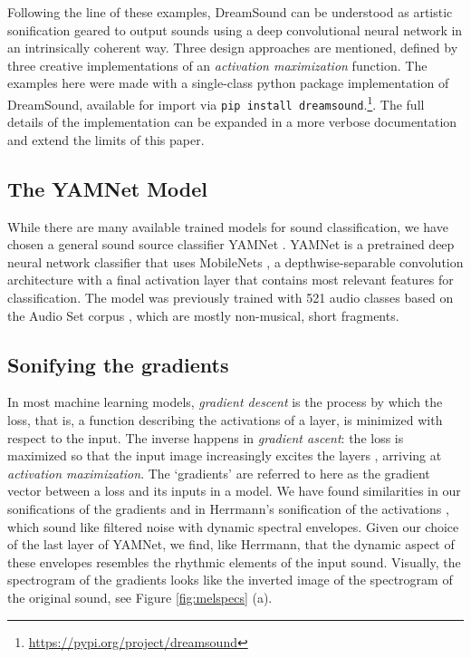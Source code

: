 \documentclass[a4paper,10pt,oneside]{article}
\begin{document}
\begin{sloppy}
Following the line of these examples, DreamSound can be understood as artistic sonification geared to output sounds using a deep convolutional neural network in an intrinsically coherent way. Three design approaches are mentioned, defined by three creative implementations of an \textit{activation maximization} function. The examples here were made with a single-class python package implementation of DreamSound, available for import via \texttt{pip install dreamsound}.\footnote{\url{https://pypi.org/project/dreamsound}}. The full details of the implementation can be expanded in a more verbose documentation and extend the limits of this paper.



\subsection{The YAMNet Model}
\label{subsec:yamnet}
While there are many available trained models for sound classification, we have chosen a general sound source classifier YAMNet \cite{YamNet2020}. YAMNet is a pretrained deep neural network classifier that uses MobileNets \cite{howard2017mobilenets}, a depthwise-separable convolution architecture with a final activation layer that contains most relevant features for classification. The model was previously trained with 521 audio classes based on the Audio  Set corpus \cite{2017audioset}, which are mostly non-musical, short fragments. 

\subsection{Sonifying the gradients}
\label{subsec:gradients}
In most machine learning models, \textit{gradient descent} is the process by which the loss, that is, a function describing the activations of a layer, is minimized with respect to the input. The inverse happens in \textit{gradient ascent}: the loss is maximized so that the input image increasingly excites the layers \cite{DeepDreamTutorial}, arriving at \textit{activation maximization}. The `gradients' are referred to here as the gradient vector between a loss and its inputs in a model. We have found similarities in our sonifications of the gradients and in Herrmann's sonification of the activations \cite{pmlr-v123-herrmann20a}, which sound like filtered noise with dynamic spectral envelopes. Given our choice of the last layer of YAMNet, we find, like Herrmann, that the dynamic aspect of these envelopes resembles the rhythmic elements of the input sound. Visually, the spectrogram of the gradients looks like the inverted image of the spectrogram of the original sound, see Figure \ref{fig:melspecs} (a).


\end{sloppy}
\end{document}
